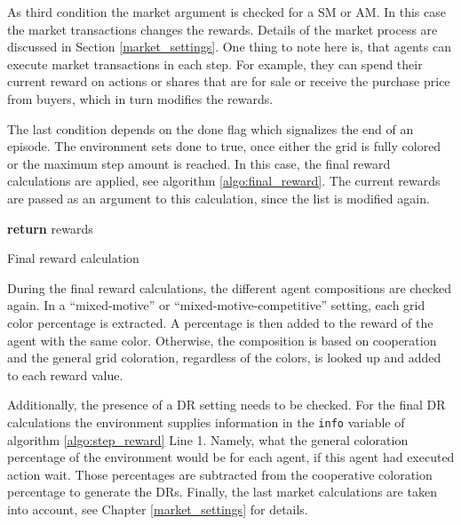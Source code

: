 As third condition the market argument is checked for a SM or AM. In this case the market transactions changes the rewards. Details of the market process are discussed in Section \ref{market_settings}. One thing to note here is, that agents can execute market transactions in each step. For example, they can spend their current reward on actions or shares that are for sale or receive the purchase price from buyers, which in turn modifies the rewards.

The last condition depends on the done flag which signalizes the end of an episode. The environment sets done to true, once either the grid is fully colored or the maximum step amount is reached. In this case, the final reward calculations are applied, see algorithm \ref{algo:final_reward}. The current rewards are passed as an argument to this calculation, since the list is modified again.

\begin{algorithm}[H]
    \DontPrintSemicolon
    \;
    \;
    \textbf{return} rewards\;
    \caption{Final reward calculation}\label{algo:final_reward}
\end{algorithm}

During the final reward calculations, the different agent compositions are checked again. In a ``mixed-motive'' or ``mixed-motive-competitive'' setting, each grid color percentage is extracted. A percentage is then added to the reward of the agent with the same color. Otherwise, the composition is based on cooperation and the general grid coloration, regardless of the colors, is looked up and added to each reward value. 

Additionally, the presence of a DR setting needs to be checked. For the final DR calculations the environment supplies information in the \verb|info| variable of algorithm \ref{algo:step_reward} Line 1. Namely, what the general coloration percentage of the environment would be for each agent, if this agent had executed action wait. Those percentages are subtracted from the cooperative coloration percentage to generate the DRs. Finally, the last market calculations are taken into account, see Chapter \ref{market_settings} for details.

